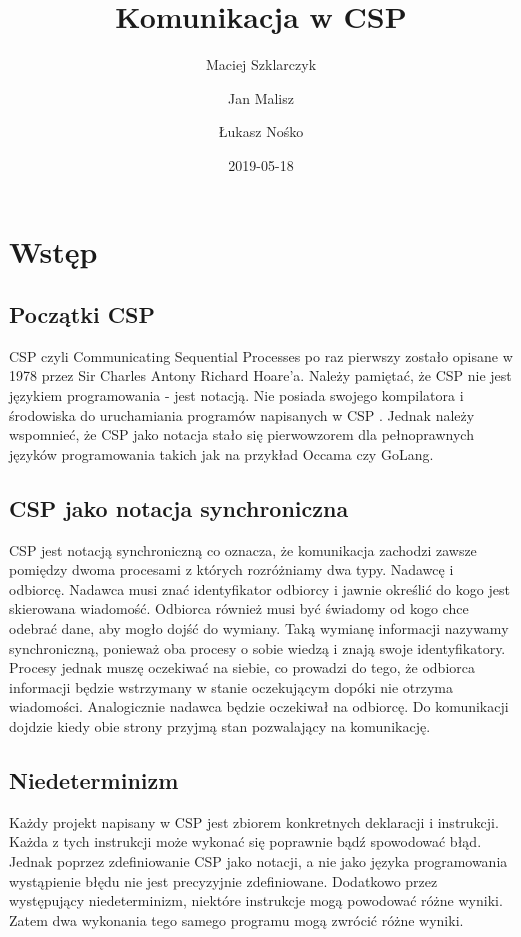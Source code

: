 \documentclass[a4paper]{report}
\title{Komunikacja w CSP}
\author{
Maciej Szklarczyk
\and
Jan Malisz
\and
Łukasz Nośko
}
\date{2019-05-18}
\begin{document}
  \maketitle
  \thispagestyle{empty}
  \newpage

  \tableofcontents
  \newpage

  \chapter{Wstęp}

  \section{Początki CSP}
  CSP czyli Communicating Sequential Processes po raz pierwszy zostało opisane w 1978 przez Sir Charles Antony Richard Hoare’a.
  Należy pamiętać, że CSP nie jest językiem programowania - jest notacją.
  Nie posiada swojego kompilatora i środowiska do uruchamiania programów napisanych w CSP .
  Jednak należy wspomnieć, że CSP jako notacja stało się pierwowzorem dla pełnoprawnych języków programowania takich jak na przykład Occama czy GoLang.

  \section{CSP jako notacja synchroniczna}
  CSP jest notacją synchroniczną co oznacza, że komunikacja zachodzi zawsze pomiędzy dwoma procesami z których rozróżniamy dwa typy.
  Nadawcę i odbiorcę.
  Nadawca musi znać identyfikator odbiorcy i jawnie określić do kogo jest skierowana wiadomość.
  Odbiorca również musi być świadomy od kogo chce odebrać dane, aby mogło dojść do wymiany.
  Taką wymianę informacji nazywamy synchroniczną, ponieważ oba procesy o sobie wiedzą i znają swoje identyfikatory.
  Procesy jednak muszę oczekiwać na siebie, co prowadzi do tego, że odbiorca informacji będzie wstrzymany w stanie oczekującym dopóki nie otrzyma wiadomości.
  Analogicznie nadawca będzie oczekiwał na odbiorcę.
  Do komunikacji dojdzie kiedy obie strony przyjmą stan pozwalający na komunikację.

  \section{Niedeterminizm}
  Każdy projekt napisany w CSP jest zbiorem konkretnych deklaracji i instrukcji.
  Każda z tych instrukcji może wykonać się poprawnie bądź spowodować błąd.
  Jednak poprzez zdefiniowanie CSP jako notacji, a nie jako języka programowania wystąpienie błędu nie jest precyzyjnie zdefiniowane.
  Dodatkowo przez występujący niedeterminizm, niektóre instrukcje mogą powodować różne wyniki.
  Zatem dwa wykonania tego samego programu mogą zwrócić różne wyniki.
\end{document}
